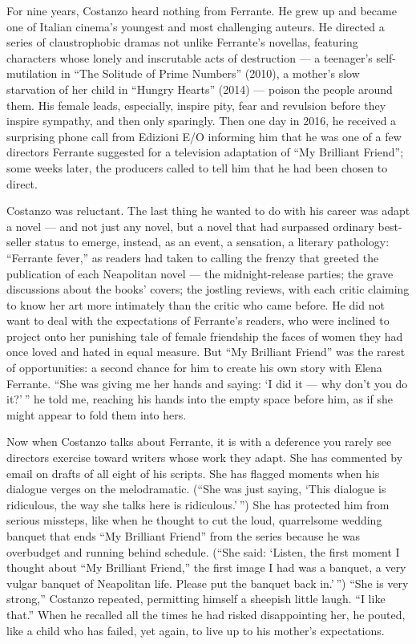 For nine years, Costanzo heard nothing from Ferrante. He grew up and
became one of Italian cinema's youngest and most challenging auteurs. He
directed a series of claustrophobic dramas not unlike Ferrante's
novellas, featuring characters whose lonely and inscrutable acts of
destruction --- a teenager's self-mutilation in ``The Solitude of Prime
Numbers'' (2010), a mother's slow starvation of her child in ``Hungry
Hearts'' (2014) --- poison the people around them. His female leads,
especially, inspire pity, fear and revulsion before they inspire
sympathy, and then only sparingly. Then one day in 2016, he received a
surprising phone call from Edizioni E/O informing him that he was one of
a few directors Ferrante suggested for a television adaptation of ``My
Brilliant Friend''; some weeks later, the producers called to tell him
that he had been chosen to direct.

Costanzo was reluctant. The last thing he wanted to do with his career
was adapt a novel --- and not just any novel, but a novel that had
surpassed ordinary best-seller status to emerge, instead, as an event, a
sensation, a literary pathology: ``Ferrante fever,'' as readers had
taken to calling the frenzy that greeted the publication of each
Neapolitan novel --- the midnight-release parties; the grave discussions
about the books' covers; the jostling reviews, with each critic claiming
to know her art more intimately than the critic who came before. He did
not want to deal with the expectations of Ferrante's readers, who were
inclined to project onto her punishing tale of female friendship the
faces of women they had once loved and hated in equal measure. But ``My
Brilliant Friend'' was the rarest of opportunities: a second chance for
him to create his own story with Elena Ferrante. ``She was giving me her
hands and saying: `I did it --- why don't you do it?' '' he told me,
reaching his hands into the empty space before him, as if she might
appear to fold them into hers.

Now when Costanzo talks about Ferrante, it is with a deference you
rarely see directors exercise toward writers whose work they adapt. She
has commented by email on drafts of all eight of his scripts. She has
flagged moments when his dialogue verges on the melodramatic. (``She was
just saying, `This dialogue is ridiculous, the way she talks here is
ridiculous.' '') She has protected him from serious missteps, like when
he thought to cut the loud, quarrelsome wedding banquet that ends ``My
Brilliant Friend'' from the series because he was overbudget and running
behind schedule. (``She said: `Listen, the first moment I thought about
``My Brilliant Friend,'' the first image I had was a banquet, a very
vulgar banquet of Neapolitan life. Please put the banquet back in.' '')
``She is very strong,'' Costanzo repeated, permitting himself a sheepish
little laugh. ``I like that.'' When he recalled all the times he had
risked disappointing her, he pouted, like a child who has failed, yet
again, to live up to his mother's expectations.


